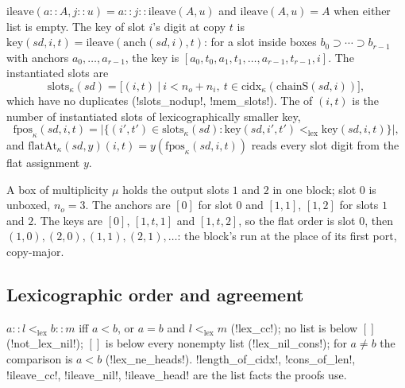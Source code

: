 \begin{definition}\label{def:lean-sym-fpos}
$\mathrm{ileave}(a\mathbin{::}A,j\mathbin{::}u)=a\mathbin{::}j\mathbin{::}\mathrm{ileave}(A,u)$ and $\mathrm{ileave}(A,u)=A$ when either list is empty. The key of slot $i$'s digit at copy $t$ is $\mathrm{key}(\mathit{sd},i,t)=\mathrm{ileave}(\mathrm{anch}(\mathit{sd},i),t)$: for a slot inside boxes $b_0\supset\cdots\supset b_{r-1}$ with anchors $a_0,\dots,a_{r-1}$, the key is $[a_0,t_0,a_1,t_1,\dots,a_{r-1},t_{r-1},i]$. The instantiated slots are
\[
\mathrm{slots}_\kappa(\mathit{sd})=\bigl[(i,t)\ \big|\ i<n_o+n_i,\ t\in\mathrm{cidx}_\kappa(\mathrm{chainS}(\mathit{sd},i))\bigr],
\]
which have no duplicates (\lean!slots_nodup!, \lean!mem_slots!). The  of $(i,t)$ is the number of instantiated slots of lexicographically smaller key,
\[
\mathrm{fpos}_\kappa(\mathit{sd},i,t)=\bigl|\{(i',t')\in\mathrm{slots}_\kappa(\mathit{sd}) : \mathrm{key}(\mathit{sd},i',t')<_{\mathrm{lex}}\mathrm{key}(\mathit{sd},i,t)\}\bigr|,
\]
and $\mathrm{flatAt}_\kappa(\mathit{sd},y)(i,t)=y(\mathrm{fpos}_\kappa(\mathit{sd},i,t))$ reads every slot digit from the flat assignment $y$.
\end{definition}

\begin{example}
A box of multiplicity $\mu$ holds the output slots $1$ and $2$ in one block; slot $0$ is unboxed, $n_o=3$. The anchors are $[0]$ for slot $0$ and $[1,1]$, $[1,2]$ for slots $1$ and $2$. The keys are $[0]$, $[1,t,1]$ and $[1,t,2]$, so the flat order is slot $0$, then $(1,0),(2,0),(1,1),(2,1),\dots$: the block's run at the place of its first port, copy-major.
\end{example}

\subsection{Lexicographic order and agreement}

\begin{proposition}
$a\mathbin{::}l<_{\mathrm{lex}}b\mathbin{::}m$ iff $a<b$, or $a=b$ and $l<_{\mathrm{lex}}m$ (\lean!lex_cc!); no list is below $[]$ (\lean!not_lex_nil!); $[]$ is below every nonempty list (\lean!lex_nil_cons!); for $a\neq b$ the comparison is $a<b$ (\lean!lex_ne_heads!). \lean!length_of_cidx!, \lean!cons_of_len!, \lean!ileave_cc!, \lean!ileave_nil!, \lean!ileave_head! are the list facts the proofs use.
\end{proposition}

